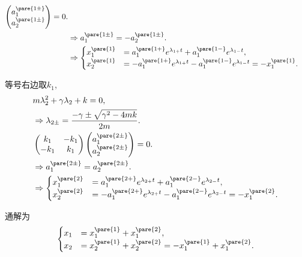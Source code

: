 \documentclass[../LectureNotes.tex]{subfiles}
\begin{document}
\begin{sample}
\begin{ex}
\begin{cenum}
\begin{align*}
\begin{pmatrix}
                    a_1^{\pare{1\pm}} \\ a_2^{\pare{1\pm}}
                \end{pmatrix} = 0. \\
                & \Rightarrow a_1^{\pare{1\pm}} = -a_2^{\pare{1\pm}}. \\
                & \Rightarrow \begin{cases}
                    x_1^{\pare{1}} &= a_1^{\pare{1+}} e^{\lambda_{1+}t} + a_1^{\pare{1-}} e^{\lambda_{1-}t}, \\
                    x_2^{\pare{1}} &= -a_1^{\pare{1+}} e^{\lambda_{1+}t} - a_1^{\pare{1-}} e^{\lambda_{1-}t} = -x_1^{\pare{1}}.
                \end{cases}
            \end{align*}
            \item 等号右边取$k_1$,
            \begin{align*}
                & m\lambda_2^2 + \gamma\lambda_2 + k = 0, \\
                & \Rightarrow \lambda_{2\pm} = \frac{-\gamma \pm \sqrt{\gamma^2 - 4mk}}{2m}. \\
                & \begin{pmatrix}
                    k_1 & -k_1 \\
                    -k_1 & k_1
                \end{pmatrix}\begin{pmatrix}
                    a_1^{\pare{2\pm}} \\ a_2^{\pare{2\pm}}
                \end{pmatrix} = 0. \\
                 & \Rightarrow a_1^{\pare{2\pm}} = a_2^{\pare{2\pm}}. \\
                 & \Rightarrow \begin{cases}
                    x_1^{\pare{2}} &= a_1^{\pare{2+}} e^{\lambda_{2+}t} + a_1^{\pare{2-}} e^{\lambda_{2-}t}, \\
                    x_2^{\pare{2}} &= -a_1^{\pare{2+}} e^{\lambda_{2+}t} - a_1^{\pare{2-}} e^{\lambda_{2-}t} = -x_1^{\pare{2}}.
                \end{cases}
            \end{align*}
        \end{cenum}
        通解为
        \[ \begin{cases}
            x_1 &= x_1^{\pare{1}} + x_1^{\pare{2}}, \\
            x_2 &= x_2^{\pare{1}} + x_2^{\pare{2}} = -x_1^{\pare{1}} + x_1^{\pare{2}}.

\end{cases}\]
\end{ex}
\end{sample}
\end{document}

